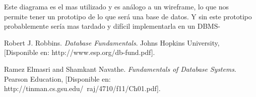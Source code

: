 \documentclass[spanish,12pt,letterpapper]{article}
\begin{document}
	Este diagrama es el mas utilizado y es análogo a un wireframe, lo que nos permite tener un prototipo de lo que será una base de datos. Y sin este prototipo probablemente sería mas tardado y difícil implementarla en un DBMS-
	
	\pagebreak
	\begin{thebibliography}{9}		
		 Robert J. Robbins. 
		\emph{Database Fundamentals}. Johns Hopkins University, [Disponible en: http://www.esp.org/db-fund.pdf].
		
		 Ramez Elmasri and Shamkant Navathe. 
		\emph{Fundamentals of Database Systems}. Pearson Education, [Disponible en: http://tinman.cs.gsu.edu/~raj/4710/f11/Ch01.pdf].

	\end{thebibliography}
\end{document}
